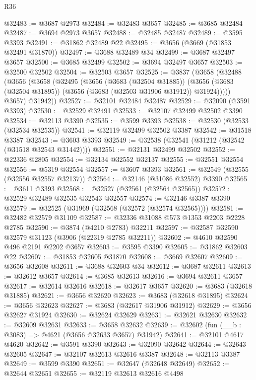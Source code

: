 \begin{lexlean}{R36}
\begin{coremodule}
@32483 := @3687 @2973
@32484 := @32483 @3657
@32485 := @3685 @32484
@32487 := @3694 @2973 @3657
@32488 := @32485 @32487
@32489 := @3595 @3393
@32491 := @31862 @32489 @22
@32495 := @3656 (@3669 (@31853 @32491 @31870))
@32497 := @3688 @32489 @34
@32499 := @3687 @32497 @3657
@32500 := @3685 @32499
@32502 := @3694 @32497 @3657
@32503 := @32500 @32502
@32504 := @32503 @3657
@32525 := @3837
    (@3658
      (@32488
        (@3656
          (@3658
            (@32495
              (@3656
                (@3683 (@32504 @31885))
                (@3656 (@3683 (@32504 @31895)) (@3656 (@3683 (@32503 @31906 @31912)) @31924)))))
          @3657)
        @31942))
@32527 := @32101 @32484 @32487
@32529 := @32090 (@3591 @3393)
@32530 := @32529 @32491
@32533 := @32107 @32499 @32502 @3390
@32534 := @32113 @3390
@32535 := @3599 @3393
@32538 := @32530 (@32533 (@32534 @32535))
@32541 := @32119 @32499 @32502 @3387
@32542 := @31518 @3387
@32543 := @3603 @3393
@32549 := @32538 (@32541 (@31212 (@32542 (@31518 @32543 @31442))))
@32551 := @32131 @32499 @32502
@32552 := @22336 @2805
@32554 := @32134 @32552 @32137
@32555 := @32551 @32554
@32556 := @5319 @32554
@32557 := @3607 @3393
@32561 := @32549 (@32555 (@32556 @32557 @32137))
@32564 := @32146 (@31086 @32552) @3390
@32565 := @3611 @3393
@32568 := @32527 (@32561 (@32564 @32565))
@32572 := @32529 @32489 @32535 @32543 @32557
@32574 := @32146 @3387 @3390
@32579 := @32525 (@31969 (@32568 (@32572 (@32574 @32565))))
@32581 := @32482 @32579 @31109
@32587 := @32336 @31088 @573 @1353 @2203 @2228 @2785
@32590 := @3874 (@4210 @2783) @32211
@32597 := @32587 @32590 @32579 @31123 (@3906 (@22319 @2785 @32211))
@32602 := @4610 @32590 @496 @2191 @2202 @3657
@32603 := @3595 @3390
@32605 := @31862 @32603 @22
@32607 := @31853 @32605 @31870
@32608 := @3669 @32607
@32609 := @3656 @32608
@32611 := @3688 @32603 @34
@32612 := @3687 @32611
@32613 := @32612 @3657
@32614 := @3685 @32613
@32616 := @3694 @32611 @3657
@32617 := @32614 @32616
@32618 := @32617 @3657
@32620 := @3683 (@32618 @31885)
@32621 := @3656 @32620
@32623 := @3683 (@32618 @31895)
@32624 := @3656 @32623
@32627 := @3683 (@32617 @31906 @31912)
@32629 := @3656 @32627 @31924
@32630 := @32624 @32629
@32631 := @32621 @32630
@32632 := @32609 @32631
@32633 := @3658 @32632
@32639 := @32602 (fun (__b : @3083) => @4621 (@3656 @32633 @3657) @31942)
@32641 := @32101 @4617 @4620
@32642 := @3591 @3390
@32643 := @32090 @32642
@32644 := @32643 @32605
@32647 := @32107 @32613 @32616 @3387
@32648 := @32113 @3387
@32649 := @3599 @3390
@32651 := @32647 (@32648 @32649)
@32652 := @32644 @32651
@32655 := @32119 @32613 @32616 @4498

\end{coremodule}
\end{lexlean}
